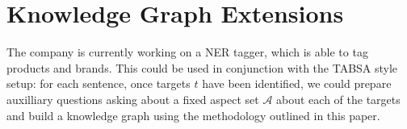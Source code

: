\section{Knowledge Graph Extensions}
The company is currently working on a NER tagger, which is able to tag products and brands. This could be used in conjunction with the TABSA style setup: for each sentence, once targets $t$ have been identified, we could prepare auxilliary questions asking about a fixed aspect set $\mathcal{A}$ about each of the targets and build a knowledge graph using the methodology outlined in this paper.